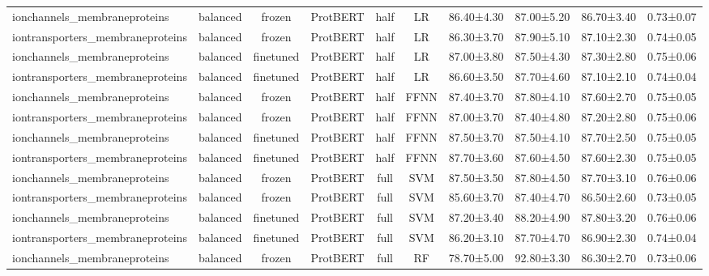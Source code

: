 \begin{tabular}{lcccccc}
    ionchannels\_membraneproteins &   balanced &         frozen &     ProtBERT &      half &         LR &  86.40±4.30 &  87.00±5.20 &  86.70±3.40 & 0.73±0.07 \\
iontransporters\_membraneproteins &   balanced &         frozen &     ProtBERT &      half &         LR &  86.30±3.70 &  87.90±5.10 &  87.10±2.30 & 0.74±0.05 \\
    ionchannels\_membraneproteins &   balanced &      finetuned &     ProtBERT &      half &         LR &  87.00±3.80 &  87.50±4.30 &  87.30±2.80 & 0.75±0.06 \\
iontransporters\_membraneproteins &   balanced &      finetuned &     ProtBERT &      half &         LR &  86.60±3.50 &  87.70±4.60 &  87.10±2.10 & 0.74±0.04 \\
    ionchannels\_membraneproteins &   balanced &         frozen &     ProtBERT &      half &       FFNN &  87.40±3.70 &  87.80±4.10 &  87.60±2.70 & 0.75±0.05 \\
iontransporters\_membraneproteins &   balanced &         frozen &     ProtBERT &      half &       FFNN &  87.00±3.70 &  87.40±4.80 &  87.20±2.80 & 0.75±0.06 \\
    ionchannels\_membraneproteins &   balanced &      finetuned &     ProtBERT &      half &       FFNN &  87.50±3.70 &  87.50±4.10 &  87.70±2.50 & 0.75±0.05 \\
iontransporters\_membraneproteins &   balanced &      finetuned &     ProtBERT &      half &       FFNN &  87.70±3.60 &  87.60±4.50 &  87.60±2.30 & 0.75±0.05 \\
    ionchannels\_membraneproteins &   balanced &         frozen &     ProtBERT &      full &        SVM &  87.50±3.50 &  87.80±4.50 &  87.70±3.10 & 0.76±0.06 \\
iontransporters\_membraneproteins &   balanced &         frozen &     ProtBERT &      full &        SVM &  85.60±3.70 &  87.40±4.70 &  86.50±2.60 & 0.73±0.05 \\
    ionchannels\_membraneproteins &   balanced &      finetuned &     ProtBERT &      full &        SVM &  87.20±3.40 &  88.20±4.90 &  87.80±3.20 & 0.76±0.06 \\
iontransporters\_membraneproteins &   balanced &      finetuned &     ProtBERT &      full &        SVM &  86.20±3.10 &  87.70±4.70 &  86.90±2.30 & 0.74±0.04 \\
    ionchannels\_membraneproteins &   balanced &         frozen &     ProtBERT &      full &         RF &  78.70±5.00 &  92.80±3.30 &  86.30±2.70 & 0.73±0.06 \\

\end{tabular}
